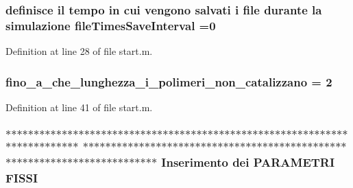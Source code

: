 \hypertarget{a00065_a825ee95e200498001c9f82b9637c1ff5}{
\subsubsection[{file\-Times\-Save\-Interval}]{\setlength{\rightskip}{0pt plus 5cm}definisce il tempo in cui vengono salvati {\bf i} {\bf file} durante la {\bf simulazione} file\-Times\-Save\-Interval =0}}\label{a00065_a825ee95e200498001c9f82b9637c1ff5}


Definition at line 28 of file start.\-m.

\hypertarget{a00065_ab6966d9ee620bc7376dc41a38352b948}{
\subsubsection[{fino\-\_\-a\-\_\-che\-\_\-lunghezza\-\_\-i\-\_\-polimeri\-\_\-non\-\_\-catalizzano}]{\setlength{\rightskip}{0pt plus 5cm}fino\-\_\-a\-\_\-che\-\_\-lunghezza\-\_\-i\-\_\-polimeri\-\_\-non\-\_\-catalizzano = 2}}\label{a00065_ab6966d9ee620bc7376dc41a38352b948}


Definition at line 41 of file start.\-m.

\hypertarget{a00065_aea8a3181c0f6f0f47e51930921720484}{
\subsubsection[{F\-I\-S\-S\-I}]{\setlength{\rightskip}{0pt plus 5cm}$\ast$$\ast$$\ast$$\ast$$\ast$$\ast$$\ast$$\ast$$\ast$$\ast$$\ast$$\ast$$\ast$$\ast$$\ast$$\ast$$\ast$$\ast$$\ast$$\ast$$\ast$$\ast$$\ast$$\ast$$\ast$$\ast$$\ast$$\ast$$\ast$$\ast$$\ast$$\ast$$\ast$$\ast$$\ast$$\ast$$\ast$$\ast$$\ast$$\ast$$\ast$$\ast$$\ast$$\ast$$\ast$$\ast$$\ast$$\ast$$\ast$$\ast$$\ast$$\ast$$\ast$$\ast$$\ast$$\ast$$\ast$$\ast$$\ast$$\ast$$\ast$$\ast$$\ast$$\ast$$\ast$$\ast$$\ast$$\ast$$\ast$$\ast$$\ast$$\ast$$\ast$$\ast$ $\ast$$\ast$$\ast$$\ast$$\ast$$\ast$$\ast$$\ast$$\ast$$\ast$$\ast$$\ast$$\ast$$\ast$$\ast$$\ast$$\ast$$\ast$$\ast$$\ast$$\ast$$\ast$$\ast$$\ast$$\ast$$\ast$$\ast$$\ast$$\ast$$\ast$$\ast$$\ast$$\ast$$\ast$$\ast$$\ast$$\ast$$\ast$$\ast$$\ast$$\ast$$\ast$$\ast$$\ast$$\ast$$\ast$$\ast$$\ast$$\ast$$\ast$$\ast$$\ast$$\ast$$\ast$$\ast$$\ast$$\ast$$\ast$$\ast$$\ast$$\ast$$\ast$$\ast$$\ast$$\ast$$\ast$$\ast$$\ast$$\ast$$\ast$$\ast$$\ast$$\ast$$\ast$ Inserimento dei P\-A\-R\-A\-M\-E\-T\-R\-I F\-I\-S\-S\-I}}\label{a00065_aea8a3181c0f6f0f47e51930921720484}


